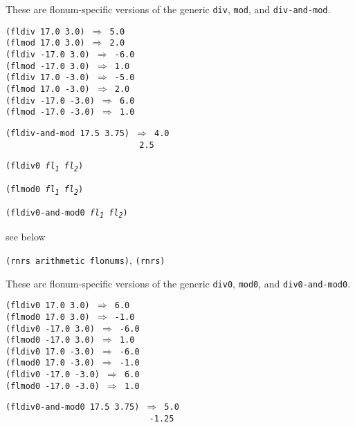 These are flonum-specific versions of the generic \texttt{div},
\texttt{mod}, and \texttt{div-and-mod}.


\begin{alltt}
(fldiv 17.0 3.0) \(\Rightarrow\) 5.0
(flmod 17.0 3.0) \(\Rightarrow\) 2.0
(fldiv -17.0 3.0) \(\Rightarrow\) -6.0
(flmod -17.0 3.0) \(\Rightarrow\) 1.0
(fldiv 17.0 -3.0) \(\Rightarrow\) -5.0
(flmod 17.0 -3.0) \(\Rightarrow\) 2.0
(fldiv -17.0 -3.0) \(\Rightarrow\) 6.0
(flmod -17.0 -3.0) \(\Rightarrow\) 1.0

(fldiv-and-mod 17.5 3.75) \(\Rightarrow\) 4.0
                           2.5
\end{alltt}

\begin{description}

\label{objects_s189}\item[procedure] \texttt{(fldiv0 \textit{fl\textsubscript{1}} \textit{fl\textsubscript{2}})}



\item[procedure] \texttt{(flmod0 \textit{fl\textsubscript{1}} \textit{fl\textsubscript{2}})}



\item[procedure] \texttt{(fldiv0-and-mod0 \textit{fl\textsubscript{1}} \textit{fl\textsubscript{2}})}



\item[returns] see below


\item[libraries] \texttt{(rnrs arithmetic flonums)}, \texttt{(rnrs)}
\end{description}


These are flonum-specific versions of the generic \texttt{div0},
\texttt{mod0}, and \texttt{div0-and-mod0}.


\begin{alltt}
(fldiv0 17.0 3.0) \(\Rightarrow\) 6.0
(flmod0 17.0 3.0) \(\Rightarrow\) -1.0
(fldiv0 -17.0 3.0) \(\Rightarrow\) -6.0
(flmod0 -17.0 3.0) \(\Rightarrow\) 1.0
(fldiv0 17.0 -3.0) \(\Rightarrow\) -6.0
(flmod0 17.0 -3.0) \(\Rightarrow\) -1.0
(fldiv0 -17.0 -3.0) \(\Rightarrow\) 6.0
(flmod0 -17.0 -3.0) \(\Rightarrow\) 1.0

(fldiv0-and-mod0 17.5 3.75) \(\Rightarrow\) 5.0
                             -1.25
\end{alltt}

